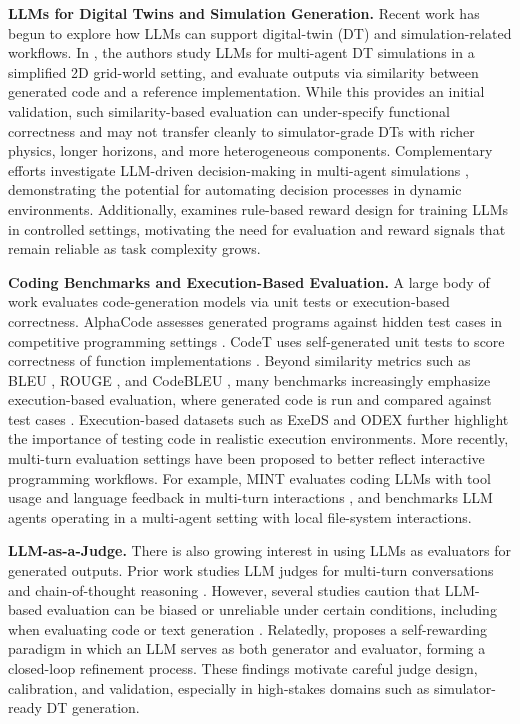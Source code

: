 \noindent\textbf{LLMs for Digital Twins and Simulation Generation.}
Recent work has begun to explore how LLMs can support digital-twin (DT) and simulation-related workflows.
In \cite{xia2024LLM_multi_agent_simulation}, the authors study LLMs for multi-agent DT simulations in a simplified 2D grid-world setting, and evaluate outputs via similarity between generated code and a reference implementation.
While this provides an initial validation, such similarity-based evaluation can under-specify functional correctness and may not transfer cleanly to simulator-grade DTs with richer physics, longer horizons, and more heterogeneous components.
Complementary efforts investigate LLM-driven decision-making in multi-agent simulations \cite{zhang2024llmDT_decision}, demonstrating the potential for automating decision processes in dynamic environments.
Additionally, \cite{mu2024rule} examines rule-based reward design for training LLMs in controlled settings, motivating the need for evaluation and reward signals that remain reliable as task complexity grows.

\noindent\textbf{Coding Benchmarks and Execution-Based Evaluation.}
A large body of work evaluates code-generation models via unit tests or execution-based correctness.
AlphaCode assesses generated programs against hidden test cases in competitive programming settings \cite{li2022competition}.
CodeT uses self-generated unit tests to score correctness of function implementations \cite{chen2022codet}.
Beyond similarity metrics such as BLEU \cite{Papineni2002BleuAM}, ROUGE \cite{lin-2004-rouge}, and CodeBLEU \cite{ren2020codebleu}, many benchmarks increasingly emphasize execution-based evaluation, where generated code is run and compared against test cases \cite{austin2021program, chen2021evaluating, huang-etal-2022-execution, Lai2022DS1000, hendrycksapps2021}.
Execution-based datasets such as ExeDS \cite{huang-etal-2022-execution} and ODEX \cite{wang2023executionbased} further highlight the importance of testing code in realistic execution environments.
More recently, multi-turn evaluation settings have been proposed to better reflect interactive programming workflows.
For example, MINT evaluates coding LLMs with tool usage and language feedback in multi-turn interactions \cite{wang2024mintevaluatingllmsmultiturn}, and \cite{zhang2024pybenchevaluatingllmagent} benchmarks LLM agents operating in a multi-agent setting with local file-system interactions.

\noindent\textbf{LLM-as-a-Judge.}
There is also growing interest in using LLMs as evaluators for generated outputs.
Prior work studies LLM judges for multi-turn conversations and chain-of-thought reasoning \cite{zheng2023LLMasJudge}.
However, several studies caution that LLM-based evaluation can be biased or unreliable under certain conditions, including when evaluating code or text generation \cite{abdelaziz2021AAAI_benchmark_code_understanding, wang2023llm_unfair_eval}.
Relatedly, \cite{yuan2024selfrewardinglanguagemodels} proposes a self-rewarding paradigm in which an LLM serves as both generator and evaluator, forming a closed-loop refinement process.
These findings motivate careful judge design, calibration, and validation, especially in high-stakes domains such as simulator-ready DT generation.

